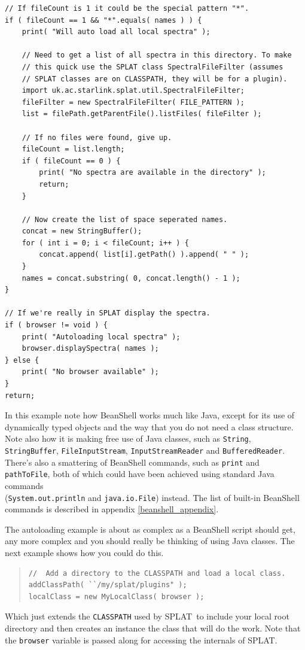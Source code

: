 \documentclass[twoside,11pt]{article}
\newcommand{\htmlref}[2]{#1}
\newcommand{\latexhtml}[2]{#1}
\renewcommand{\_}{\texttt{\symbol{95}}}
\newcommand{\SPLAT}{\textsf{SPLAT}}
\newcommand{\hitext}[1]{\texttt{#1}}
\begin{document}
\begin{verbatim}
// If fileCount is 1 it could be the special pattern "*".
if ( fileCount == 1 && "*".equals( names ) ) {
    print( "Will auto load all local spectra" );

    // Need to get a list of all spectra in this directory. To make
    // this quick use the SPLAT class SpectralFileFilter (assumes
    // SPLAT classes are on CLASSPATH, they will be for a plugin).
    import uk.ac.starlink.splat.util.SpectralFileFilter;
    fileFilter = new SpectralFileFilter( FILE_PATTERN );
    list = filePath.getParentFile().listFiles( fileFilter );

    // If no files were found, give up.
    fileCount = list.length;
    if ( fileCount == 0 ) {
        print( "No spectra are available in the directory" );
        return;
    }

    // Now create the list of space seperated names.
    concat = new StringBuffer();
    for ( int i = 0; i < fileCount; i++ ) {
        concat.append( list[i].getPath() ).append( " " );
    }
    names = concat.substring( 0, concat.length() - 1 );
}

// If we're really in SPLAT display the spectra.
if ( browser != void ) {
    print( "Autoloading local spectra" );
    browser.displaySpectra( names );
} else {
    print( "No browser available" );
}
return;
\end{verbatim}

In this example note how BeanShell works much like Java, except for
its use of dynamically typed objects and the way that you do not need
a class structure. Note also how it is making free use of Java
classes, such as \hitext{String}, \hitext{StringBuffer},
\hitext{FileInputStream}, \hitext{InputStreamReader} and
\hitext{BufferedReader}. There's also a smattering of BeanShell
commands, such as \hitext{print} and \hitext{pathToFile}, both of
which could have been achieved using standard Java commands \\
(\hitext{System.out.println} and \hitext{java.io.File})
instead. The list of built-in BeanShell commands is described
\latexhtml{in appendix \ref{beanshell_appendix}}
{\htmlref{later}{beanshell_appendix}}.

The autoloading example is about as complex as a BeanShell script
should get, any more complex and you should really be thinking of
using Java classes. The next example shows how you could do this.
\begin{quote}
\begin{verbatim}
//  Add a directory to the CLASSPATH and load a local class.
addClassPath( ``/my/splat/plugins" );
localClass = new MyLocalClass( browser );
\end{verbatim}
\end{quote}
Which just extends the \hitext{CLASSPATH} used by \SPLAT\ to include
your local root directory and then creates an instance the class that
will do the work. Note that the \hitext{browser} variable is passed
along for accessing the internals of \SPLAT.
\end{document}
